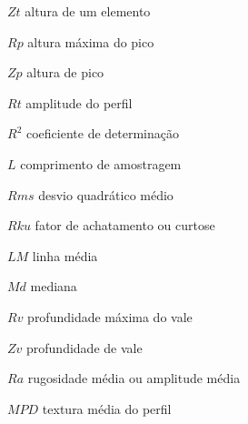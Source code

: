 \documentclass[
        12pt,
        openany, %
        oneside, %
        a4paper,			
        english,			
        brazil			        %
        abntfigtabnum     
        ]{abntbibifspcampinas}
\begin{document}
\begin{simbolos} %
 \item[$Zt$] altura de um elemento%
\item[$Rp$] altura máxima do pico%
\item[$Zp$] altura de pico%
\item[$Rt$] amplitude do perfil%
\item[$R^2$] coeficiente de determinação
\item[$L$] comprimento de amostragem%
\item[$Rms$] desvio quadrático médio%
\item[$Rku$] fator de achatamento ou curtose%
\item[$LM$] linha média%
\item[$Md$] mediana%
\item[$Rv$] profundidade máxima do vale%
\item[$Zv$] profundidade de vale%
\item[$Ra$] rugosidade média ou amplitude média%
\item[$MPD$] textura média do perfil%
 \end{simbolos}

\pagestyle{empty}

\tableofcontents
\cleardoublepage



\textual
\pagestyle{scrplain} 
\clearscrheadfoot            %
\rohead[\pagemark]{\pagemark}%







\pagestyle{scrplain} 

\pagestyle{scrplain} 

\postextual



\end{document}
